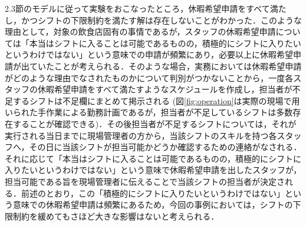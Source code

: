 \documentclass[11pt]{jsarticle}
\begin{document}
2.3節のモデルに従って実験をおこなったところ，休暇希望申請をすべて満たし，かつシフトの下限制約を満たす解は存在しないことがわかった．このような理由として，対象の飲食店固有の事情であるが，スタッフの休暇希望申請については「本当はシフトに入ることは可能であるものの，積極的にシフトに入りたいというわけではない」という意味での申請が頻繁にあり，必要以上に休暇希望申請が出ていたことが考えられる．そのような場合，実務においては休暇希望申請がどのような理由でなされたものかについて判別がつかないことから，一度各スタッフの休暇希望申請をすべて満たすようなスケジュールを作成し，担当者が不足するシフトは不足欄にまとめて掲示される (図\ref{fig:operation}は実際の現場で用いられた手作業による勤務計画であるが，担当者が不足しているシフトは多数存在することが確認できる)．その後担当者が不足するシフトについては，それが実行される当日までに現場管理者の方から，当該シフトのスキルを持つ各スタッフへ，その日に当該シフトが担当可能かどうか確認するための連絡がなされる．それに応じて「本当はシフトに入ることは可能であるものの，積極的にシフトに入りたいというわけではない」という意味で休暇希望申請を出したスタッフが，担当可能である旨を現場管理者に伝えることで当該シフトの担当者が決定される．前述のとおり，この「積極的にシフトに入りたいというわけではない」という意味での休暇希望申請は頻繁にあるため，今回の事例においては，シフトの下限制約を緩めてもさほど大きな影響はないと考えられる．
\end{document}
